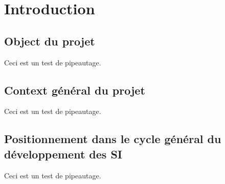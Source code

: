 \chapter{Introduction}

\section{Object du projet}

Ceci est un test de pipeautage.


\section{Context g\'en\'eral du projet}

Ceci est un test de pipeautage.


\section{Positionnement dans le cycle g\'en\'eral du d\'eveloppement des SI}

Ceci est un test de pipeautage.
